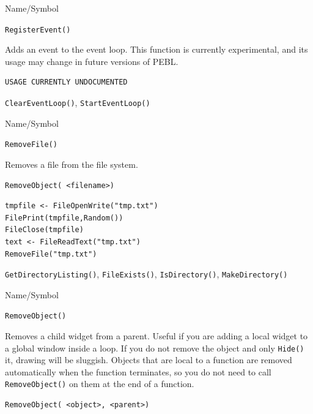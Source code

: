\begin{desc}{Name/Symbol}
\item[Name/Symbol]  	\verb+RegisterEvent()+ 

\item[Description]  Adds an event to the event loop.  This function is currently experimental, and its usage may change in future versions of PEBL.

\item[Usage]       	
\begin{verbatim}
USAGE CURRENTLY UNDOCUMENTED
\end{verbatim}

\item[Example]	

\item[See Also] 
\verb+ClearEventLoop()+, \verb+StartEventLoop()+
\end{desc}


\begin{desc}{Name/Symbol}
\item[Name/Symbol]	\verb+RemoveFile()+

\item[Description] Removes a file from the file system.
\item[Usage]
\begin{verbatim}
RemoveObject( <filename>)
\end{verbatim}

\item[Example]	

\begin{verbatim}
tmpfile <- FileOpenWrite("tmp.txt")
FilePrint(tmpfile,Random())
FileClose(tmpfile)
text <- FileReadText("tmp.txt")
RemoveFile("tmp.txt")
\end{verbatim}

\item[See Also]	
\item[See Also]\verb+GetDirectoryListing()+, \verb+FileExists()+,       \verb+IsDirectory()+,        
   \verb+MakeDirectory()+      
\end{desc}


\begin{desc}{Name/Symbol}
\item[Name/Symbol]	\verb+RemoveObject()+

\item[Description] Removes a child widget from a parent.  Useful if
  you are adding a local widget to a global window inside a loop.  If
  you do not remove the object and only \verb+Hide()+ it, drawing will
  be sluggish.  Objects that are local to a function are removed
  automatically when the function terminates, so you do not need to
  call \verb+RemoveObject()+ on them at the end of a function.

\item[Usage]
\begin{verbatim}
RemoveObject( <object>, <parent>)
\end{verbatim}

\item[Example]	

\item[See Also]	
\end{desc}


